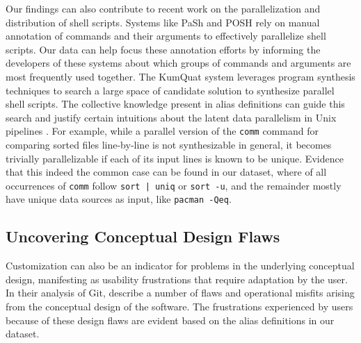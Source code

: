 \documentclass[smallextended,natbib]{svjour3}
\newcommand{\per}[1]{\numprint[\%]{#1}}
\newcommand{\cmd}[1]{{\texttt{#1}}}
\begin{document}
Our findings can also contribute to recent work on the parallelization and distribution of shell scripts.
Systems like PaSh \citep{pash} and POSH \citep{posh} rely on manual annotation of commands and their arguments to effectively parallelize shell scripts.
Our data can help focus these annotation efforts by informing the developers of these systems about which groups of commands and arguments are most frequently used together.
The KumQuat system \citep{kumquat} leverages program synthesis techniques to search a large space of candidate solution to synthesize parallel shell scripts.
The collective knowledge present in alias definitions can guide this search and justify certain intuitions about the latent data parallelism in Unix pipelines \citep{odfg}.
For example, while a parallel version of the \cmd{comm} command for comparing sorted files line-by-line is not synthesizable in general, it becomes trivially parallelizable if each of its input lines is known to be unique.
Evidence that this indeed the common case can be found in our dataset, where \per{41.29} of all occurrences of \cmd{comm} follow \texttt{sort | uniq} or \texttt{sort~-u}, and the remainder mostly have unique data sources as input, like \texttt{pacman -Qeq}.

\subsection{Uncovering Conceptual Design Flaws}

Customization can also be an indicator for problems in the underlying conceptual design, manifesting as usability frustrations that require adaptation by the user.
In their analysis of Git, \cite{perez:13,perez:16} describe a number of flaws and operational misfits arising from the conceptual design of the software.
The frustrations experienced by users because of these design flaws are evident based on the alias definitions in our dataset.
\end{document}

